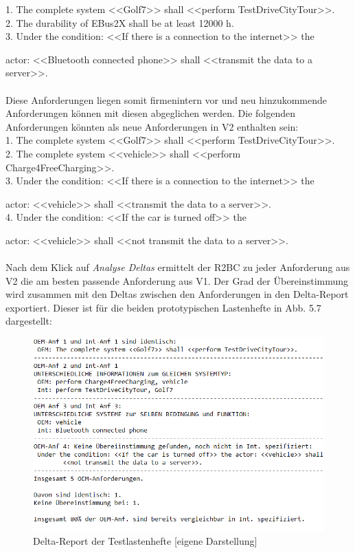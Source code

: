 \documentclass[12pt]{report}
\begin{document}
1. The complete system <<Golf7>> shall <<perform TestDriveCityTour>>.\\

2. The durability of EBus2X shall be at least 12000 h.\\

3. Under the condition: <<If there is a connection to the internet>> the 

actor: <<Bluetooth connected phone>> shall <<transmit the data to a server>>.\\
\\

Diese Anforderungen liegen somit firmenintern vor und neu hinzukommende Anforderungen können mit diesen abgeglichen werden. Die folgenden Anforderungen könnten als neue Anforderungen in V2 enthalten sein:\\

1. The complete system <<Golf7>> shall <<perform TestDriveCityTour>>.\\

2. The complete system <<vehicle>> shall <<perform Charge4FreeCharging>>.\\

3. Under the condition: <<If there is a connection to the internet>> the 

actor: <<vehicle>> shall <<transmit the data to a server>>.\\

4. Under the condition: <<If the car is turned off>> the 

actor: <<vehicle>> shall <<not transmit the data to a server>>.\\
\\

Nach dem Klick auf \textit{Analyse Deltas} ermittelt der R2BC zu jeder Anforderung aus V2 die am besten passende Anforderung aus V1. Der Grad der Übereinstimmung wird zusammen mit den Deltas zwischen den Anforderungen in den Delta-Report exportiert. Dieser ist für die beiden prototypischen Lastenhefte in Abb. 5.7 dargestellt:

\begin{figure}[h!]
\begin{center}
\includegraphics[scale=0.81]{Bilder/delta-report.png}
\caption{Delta-Report der Testlastenhefte [eigene Darstellung]}
\end{center}
\end{figure}
\end{document}
